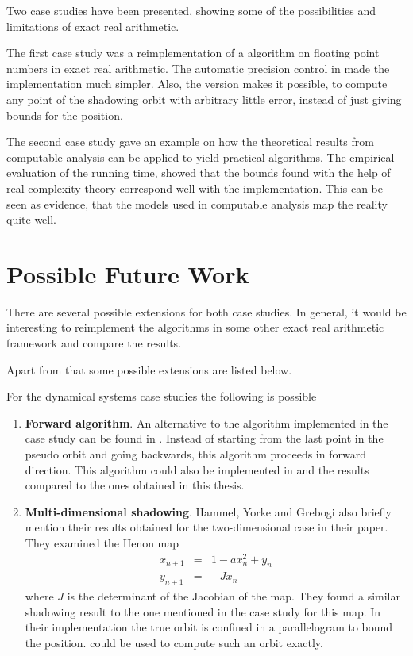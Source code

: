 Two case studies have been presented, showing some of the possibilities and
limitations of exact real arithmetic.

The first case study was a reimplementation of a algorithm on floating point
numbers in exact real arithmetic.
The automatic precision control in \irram made the implementation much simpler.
Also, the \irram version makes it possible, to compute any point of the
shadowing orbit with arbitrary little error, instead of just giving bounds for
the position.

The second case study gave an example on how the theoretical results from
computable analysis can be applied to yield practical algorithms. 
The empirical evaluation of the running time, showed that the bounds found with
the help of real complexity theory correspond well with the implementation.
This can be seen as evidence, that the models used in computable analysis
map the reality quite well.

\section{Possible Future Work}
There are several possible extensions for both case studies.
In general, it would be interesting to reimplement the algorithms in some other
exact real arithmetic framework and compare the results.

Apart from that some possible extensions are listed below.

For the dynamical systems case studies the following is possible
\begin{enumerate}
  \item \textbf{Forward algorithm}.
    An alternative to the algorithm implemented in the case study can be found in \cite{chow1991}.
    Instead of starting from the last point in the pseudo orbit and going backwards, this algorithm proceeds in forward direction.
    This algorithm could also be implemented in \irram and the results compared
    to the ones obtained in this thesis.
  \item \textbf{Multi-dimensional shadowing}.
    Hammel, Yorke and Grebogi also briefly mention their results obtained for
    the two-dimensional case in their paper.
    They examined the Henon map
    \begin{eqnarray*}
      x_{n+1} &=& 1-ax_n^2+y_n \\
      y_{n+1} &=& -Jx_n
    \end{eqnarray*}
    where $J$ is the determinant of the Jacobian of the map.
    They found a similar shadowing result to the one mentioned in the case
    study for this map.
    In their implementation the true orbit is confined in a parallelogram to
    bound the position.
    \irram could be used to compute such an orbit exactly.
\end{enumerate}

